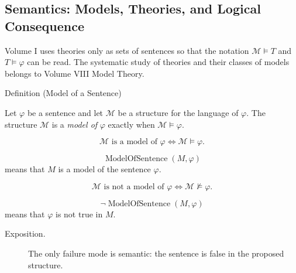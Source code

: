 
\subsection{Semantics: Models, Theories, and Logical Consequence}

\begin{remark*}
Volume I uses theories only as sets of sentences so that the notation
\(\mathcal M\models T\) and \(T\models\varphi\) can be read. The systematic
study of theories and their classes of models belongs to Volume VIII Model
Theory.
\end{remark*}

\begin{definitionbox}{Definition (Model of a Sentence)}
\begin{definition}
\label{def:model}
Let \(\varphi\) be a sentence and let \(\mathcal M\) be a structure for the
language of \(\varphi\). The structure \(\mathcal M\) is a \emph{model of}
\(\varphi\) exactly when \(\mathcal M\models\varphi\).
\end{definition}
\end{definitionbox}

\begin{remark*}
\[
\mathcal M \text{ is a model of } \varphi
\Longleftrightarrow
\mathcal M\models\varphi.
\]
\end{remark*}

\begin{remark*}
\[
  \operatorname{ModelOfSentence}(M,\varphi)
\] means that \(M\) is a model of
the sentence \(\varphi\).
\end{remark*}

\begin{remark*}
\[
\mathcal M \text{ is not a model of } \varphi
\Longleftrightarrow
\mathcal M\not\models\varphi.
\]
\end{remark*}

\begin{remark*}
\[
  \neg\operatorname{ModelOfSentence}(M,\varphi)
\] means that \(\varphi\) is not
true in \(M\).
\end{remark*}

\begin{remark*}
\begin{description}
  \item[Exposition.] The only failure mode is semantic: the sentence is false in the proposed
structure.
\end{description}
\end{remark*}

